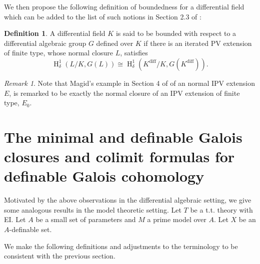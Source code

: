 \documentclass{amsart}
\theoremstyle{definition}
\newtheorem{definition}[theorem]{Definition}
\theoremstyle{remark}
\newtheorem{remark}[theorem]{Remark}
\numberwithin{equation}{section}
\def \HH {\operatorname{H}}
\def \diff {\operatorname{diff}}
\begin{document}
We then propose the following definition of boundedness for a differential field which can be added to the list of such notions in Section 2.3 of \cite{AnandDavidComm}:

\begin{definition}\label{def: diff bdd}
    A differential field $K$ is said to be bounded with respect to a differential algebraic group $G$ defined over $K$ if there is an iterated PV extension of finite type, whose normal closure $L$, satisfies $$\HH^1_{\delta}(L/K,G(L)) \cong \HH^1_{\delta}(K^{\diff}/K,G(K^{\diff})).$$
\end{definition}

\begin{remark}
    Note that Magid's example in Section 4 of \cite{magid2022completepicardvessiotclosure} of an normal IPV extension $E$, is remarked to be exactly the normal closure of an IPV extension of finite type, $E_0$. 
\end{remark}


\section{The minimal and definable Galois closures and colimit formulas for definable Galois cohomology}\label{sec: tt setting}

Motivated by the above observations in the differential algebraic setting, we give some analogous results in the model theoretic setting. Let $T$ be a t.t. theory with EI. Let $A$ be a small set of parameters and $M$ a prime model over $A$. Let $X$ be an $A$-definable set.

We make the following definitions and adjustments to the terminology to be consistent with the previous section.  
\end{document}
